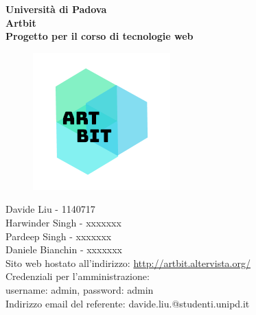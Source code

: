 \documentclass[openany, a4paper, 12pt]{report}
\begin{document}
	\begin{titlepage}
		\centering
		\vfill
		{
			\bfseries
			\vskip2cm
			\Large Università di Padova\\
			\vfill
			\Huge Artbit\\
			\Large Progetto per il corso di tecnologie web\\
			\vfill
			
			\begin{figure}[H]
				\centering
				\includegraphics[width=0.6\linewidth]{logo.png}
			\end{figure}
			\large Davide Liu - 1140717 \\ Harwinder Singh - xxxxxxx \\ Pardeep Singh - xxxxxxx \\ Daniele Bianchin - xxxxxxx \\
			\vfill
			Sito web hostato all'indirizzo: \url{http://artbit.altervista.org/}\\
			{\small Credenziali per l'amministrazione:\\username: admin, password: admin\\}
			\vfill
			Indirizzo email del referente: davide.liu.@studenti.unipd.it\\
			\vfill
		}
	\end{titlepage}
	\tableofcontents
	\newpage

\end{document}
